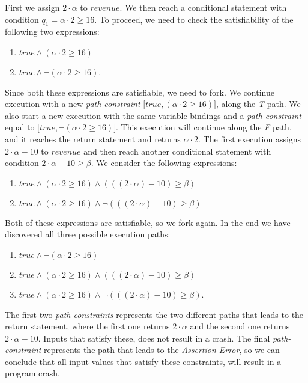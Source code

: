 		First we assign $2\cdot \alpha$ to $revenue$. We then reach a conditional statement with condition $q_1 = \alpha \cdot 2 \geq 16$. To proceed, we need to check the satisfiability of the following two expressions:
		\begin{enumerate}
			\item $true \land (\alpha \cdot 2 \geq 16)$
			\item $true \land \neg (\alpha \cdot 2 \geq 16)$.
		\end{enumerate}
		Since both these expressions are satisfiable, we need to fork. We continue execution with a new  \emph{path-constraint} $\lbrack true, (\alpha \cdot 2 \geq 16) \rbrack$, along the \emph{T} path. We also start a new execution with the same variable bindings and a \emph{path-constraint} equal to $\lbrack true, \neg (\alpha \cdot 2 \geq 16) \rbrack$. This execution will continue along the \emph{F} path, and it reaches the return statement and returns $\alpha \cdot 2$.
		The first execution assigns $2\cdot \alpha - 10$ to $revenue$ and then reach another conditional statement with condition $2\cdot \alpha - 10 \geq \beta$. We consider the following expressions:
		\begin{enumerate}
			\item $true \land (\alpha \cdot 2 \geq 16) \land (((2\cdot \alpha) - 10) \geq \beta)$
			\item $true \land (\alpha \cdot 2 \geq 16) \land \neg (((2\cdot \alpha) - 10) \geq \beta)$
		\end{enumerate}
		Both of these expressions are satisfiable, so we fork again. In the end we have discovered all three possible execution paths:
		\begin{enumerate}
			\item $true \land \neg (\alpha \cdot 2 \geq 16)$
			\item $true \land (\alpha \cdot 2 \geq 16) \land (((2\cdot \alpha) - 10) \geq \beta)$
			\item $true \land (\alpha \cdot 2 \geq 16) 
			\land \neg (((2\cdot \alpha) - 10) \geq \beta)$.
		\end{enumerate}
		
		The first two \emph{path-constraints} represents the two different paths that leads to the return statement, where the first one returns $2\cdot \alpha$ and the second one returns $2\cdot \alpha - 10$. Inputs that satisfy these, does not result in a crash.
		The final \emph{path-constraint} represents the path that leads to the \textsl{Assertion Error}, so we can conclude that all input values that satisfy these constraints, will result in a program crash.
	
